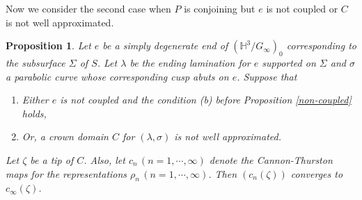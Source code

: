\documentclass{amsart}
\newtheorem{prop}[theorem]{Proposition}
\theoremstyle{definition}
\newcommand\HHH{{\mathbb H}}
\begin{document}
\begin{comment}

 in Case 1.

\noindent {\bf Proof for  Case 2:} Since there is a wild end above $E$ in the geometric limit, it follows that the vertical length of $A_l$ is uniformly bounded as $n \to \infty$.

??????
But the EL is realised in the wild end. So this should also give discontinuity by Section \ref{necessity}. Confused....????
\end{comment}

Now we consider the second case when $P$ is conjoining but $e$ is not coupled or $C$ is not well approximated.

 \begin{prop}\label{wellapprox}
	Let $e$ be a simply degenerate end of $(\HHH^3/G_\infty)_0$ corresponding to the subsurface $\Sigma$ of $S$. Let $\lambda$ be the ending lamination for $e$ supported on $\Sigma$ and $\sigma$   a parabolic curve whose corresponding cusp abuts on  $e$. Suppose that 
	\begin{enumerate}
	\item Either $e$ is not coupled and the condition (b) before Proposition \ref{non-coupled} holds,
	\item Or, a crown domain $C$ for $(\lambda, 
	\sigma)$ is {\em not} well approximated. 
	\end{enumerate}
	Let $\zeta$ be a tip of $C$. Also, let $c_n\, (n=1, \cdots, \infty)$ denote the Cannon-Thurston maps for the representations $\rho_n\, (n=1, \cdots, \infty)$.
	Then $(c_n (\zeta))$ converges to  $c_\infty (\zeta)$. 
\end{prop}
\end{document}
